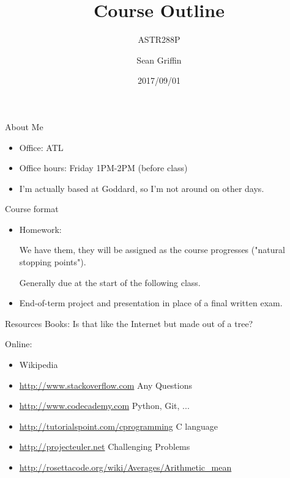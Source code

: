 \documentclass[10pt]{beamer}
\title{Course Outline}
\subtitle{ASTR288P}
\date{2017/09/01}
\author{Sean Griffin}
\institute{UMCP / NASA GSFC}
\begin{document}
\maketitle


\begin{frame}[fragile]{About Me}
	\begin{itemize}
		\item Office: ATL
		\item Office hours: Friday 1PM-2PM (before class)
		\item I'm actually based at Goddard, so I'm not around on other days.
	\end{itemize}
\end{frame}

\begin{frame}[fragile]{Course format}
	\begin{itemize}
		\item Homework: 
		
		We have them, they will be assigned as the course progresses ("natural stopping points").
			
		Generally due at the start of the following class. 
		\item End-of-term project and presentation in place of a final written exam.
	\end{itemize}
\end{frame}

\begin{frame}[fragile]{Resources}
	Books: Is that like the Internet but made out of a tree? 
	
	Online: 
	\begin{itemize}
		\item Wikipedia
		\item \url{http://www.stackoverflow.com} Any Questions
		\item \url{http://www.codecademy.com} Python, Git, ...
		\item \url{http://tutorialspoint.com/cprogramming} C language
		\item \url{http://projecteuler.net} Challenging Problems
   		\item \url{http://rosettacode.org/wiki/Averages/Arithmetic_mean}
	\end{itemize}

\end{frame}
\end{document}
